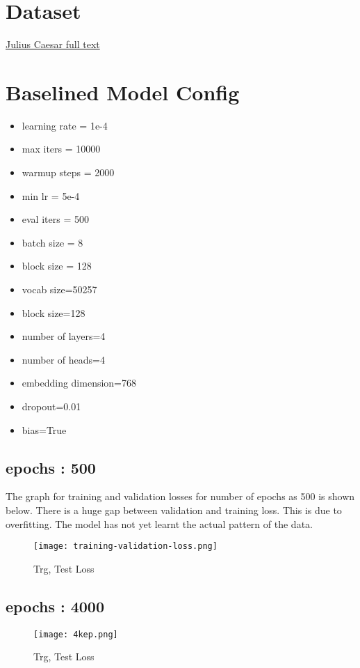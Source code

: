 \documentclass[conference]{IEEEtran}
\begin{document}
\section{Dataset}
\href{https://www.gutenberg.org/cache/epub/1522/pg1522.txt}{Julius Caesar full text}

\section{Baselined Model Config}
\begin{itemize}
    \item learning rate = 1e-4
    \item max iters = 10000
    \item warmup steps = 2000
    \item min lr = 5e-4
    \item eval iters = 500
    \item batch size = 8
    \item block size = 128
    \item vocab size=50257 
    \item block size=128 
    \item number of layers=4 
    \item number of heads=4 
    \item embedding dimension=768 
    \item dropout=0.01 
    \item bias=True
\end{itemize}
\subsection{epochs : 500}
The graph for training and validation losses for number of epochs as 500 is shown below. There is a huge gap between validation and training loss. This is due to overfitting. The model has not yet learnt the actual pattern of the data.
\begin{figure}[H]
    \centering
    \texttt{[image: training-validation-loss.png]}
    \caption{Trg, Test Loss}
    \label{fig:epoch500}
\end{figure}
\subsection{epochs : 4000}
\begin{figure}[H]
    \centering
    \texttt{[image: 4kep.png]}
    \caption{Trg, Test Loss}
    \label{fig:epoch4000}
\end{figure}
\end{document}
